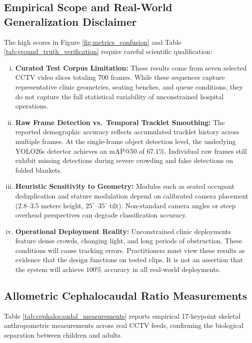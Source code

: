 \subsection{Empirical Scope and Real-World Generalization Disclaimer}
The high scores in Figure \ref{fig:metrics_confusion} and Table \ref{tab:ground_truth_verification} require careful scientific qualification:
\begin{enumerate}[(i)]
    \item \textbf{Curated Test Corpus Limitation:} These results come from seven selected CCTV video slices totaling 700 frames. While these sequences capture representative clinic geometries, seating benches, and queue conditions, they do not capture the full statistical variability of unconstrained hospital operations.
    \item \textbf{Raw Frame Detection vs.\ Temporal Tracklet Smoothing:} The reported demographic accuracy reflects accumulated tracklet history across multiple frames. At the single-frame object detection level, the underlying YOLO26s detector achieves an mAP@50 of $67.1\%$. Individual raw frames still exhibit missing detections during severe crowding and false detections on folded blankets.
    \item \textbf{Heuristic Sensitivity to Geometry:} Modules such as seated occupant deduplication and stature modulation depend on calibrated camera placement ($2.8\text{--}3.5$ meters height, $25^{\circ}\text{--}35^{\circ}$ tilt). Non-standard camera angles or steep overhead perspectives can degrade classification accuracy.
    \item \textbf{Operational Deployment Reality:} Unconstrained clinic deployments feature dense crowds, changing light, and long periods of obstruction. These conditions will cause tracking errors. Practitioners must view these results as evidence that the design functions on tested clips. It is not an assertion that the system will achieve $100\%$ accuracy in all real-world deployments.
\end{enumerate}

\subsection{Allometric Cephalocaudal Ratio Measurements}
Table \ref{tab:cephalocaudal_measurements} reports empirical 17-keypoint skeletal anthropometric measurements across real CCTV feeds, confirming the biological separation between children and adults.

